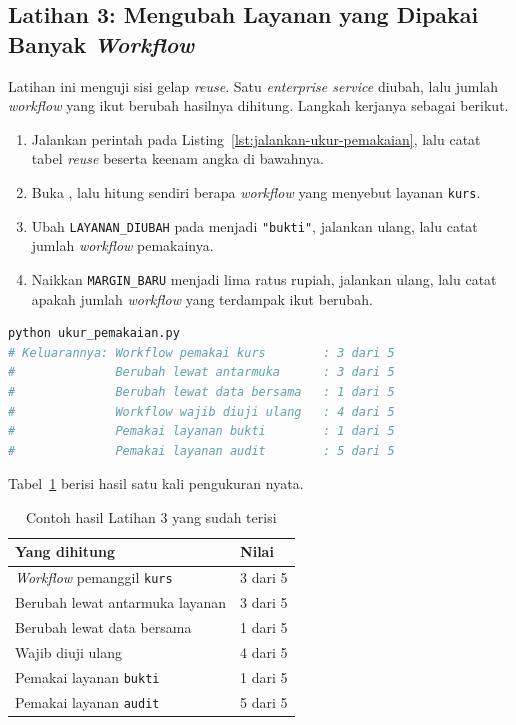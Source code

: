 \subsection*{Latihan 3: Mengubah Layanan yang Dipakai Banyak \textit{Workflow}}

Latihan ini menguji sisi gelap \textit{reuse}. Satu \textit{enterprise
service} diubah, lalu jumlah \textit{workflow} yang ikut berubah hasilnya dihitung.
Langkah kerjanya sebagai berikut.

\begin{enumerate}
  \item Jalankan perintah pada Listing~\ref{lst:jalankan-ukur-pemakaian}, lalu
    catat tabel \textit{reuse} beserta keenam angka di bawahnya.
  \item Buka , lalu hitung sendiri
    berapa \textit{workflow} yang menyebut layanan \texttt{kurs}.
  \item Ubah \texttt{LAYANAN\_DIUBAH} pada
     menjadi \texttt{"bukti"},
    jalankan ulang, lalu catat jumlah \textit{workflow} pemakainya.
  \item Naikkan \texttt{MARGIN\_BARU} menjadi lima ratus rupiah, jalankan
    ulang, lalu catat apakah jumlah \textit{workflow} yang terdampak ikut berubah.
\end{enumerate}

\begin{lstlisting}[language=bash, caption={Menghitung akibat mengubah layanan
  bersama, skrip tersedia di \berkas{sources/chapter12/ukur_pemakaian.py}},
  label=lst:jalankan-ukur-pemakaian]
python ukur_pemakaian.py
# Keluarannya: Workflow pemakai kurs        : 3 dari 5
#              Berubah lewat antarmuka      : 3 dari 5
#              Berubah lewat data bersama   : 1 dari 5
#              Workflow wajib diuji ulang   : 4 dari 5
#              Pemakai layanan bukti        : 1 dari 5
#              Pemakai layanan audit        : 5 dari 5
\end{lstlisting}

Tabel~\ref{tab:lat3odsoa-contoh} berisi hasil satu kali pengukuran nyata.

\begin{table}[htbp]
  \centering
  \caption{Contoh hasil Latihan 3 yang sudah terisi}
  \label{tab:lat3odsoa-contoh}
  \begin{tabularx}{\textwidth}{|X|l|}
    \hline
    \textbf{Yang dihitung} & \textbf{Nilai} \\
    \hline
    \textit{Workflow} pemanggil \texttt{kurs} & 3 dari 5 \\
    \hline
    Berubah lewat antarmuka layanan & 3 dari 5 \\
    \hline
    Berubah lewat data bersama & 1 dari 5 \\
    \hline
    Wajib diuji ulang & 4 dari 5 \\
    \hline
    Pemakai layanan \texttt{bukti} & 1 dari 5 \\
    \hline
    Pemakai layanan \texttt{audit} & 5 dari 5 \\
    \hline
  \end{tabularx}
\end{table}

